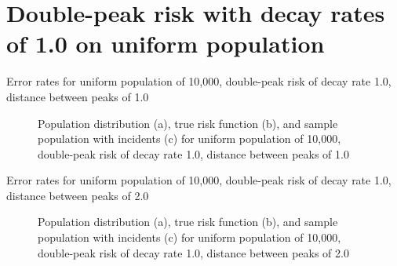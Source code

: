 \section{Double-peak risk with decay rates of 1.0 on uniform population}
\label{sec:app:results_unif_100_1_2h_X}

\graphicspath{{./results/unif_100_1_2h_1/}}
\makeatletter
{}
\makeatother

\begin{table}[H]
    
    \caption[]{Error rates for uniform population of 10,000, double-peak risk of decay rate 1.0, distance between peaks of 1.0}
    \label{tab:mean_error_rates:unif_100_1_2h_1}
\end{table}

\begin{figure}[H]
    
    \caption[]{Population distribution (a), true risk function (b), and sample population with incidents (c) for uniform population of 10,000, double-peak risk of decay rate 1.0, distance between peaks of 1.0}
    \label{fig:distributions:unif_100_1_2h_1}    
\end{figure}

\graphicspath{{./results/unif_100_1_2h_2/}}
\makeatletter
{}
\makeatother

\begin{table}[H]
    
    \caption[]{Error rates for uniform population of 10,000, double-peak risk of decay rate 1.0, distance between peaks of 2.0}
    \label{tab:mean_error_rates:unif_100_1_2h_2}
\end{table}

\begin{figure}[H]
    
    \caption[]{Population distribution (a), true risk function (b), and sample population with incidents (c) for uniform population of 10,000, double-peak risk of decay rate 1.0, distance between peaks of 2.0}
    \label{fig:distributions:unif_100_1_2h_2}    
\end{figure}

